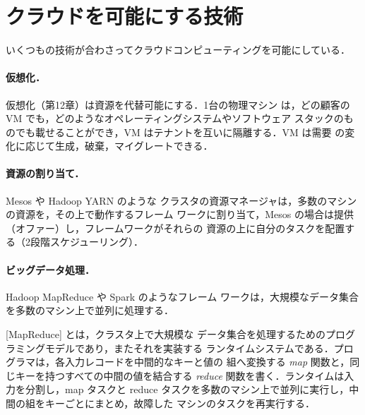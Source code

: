 \documentclass[../main.tex]{subfiles}
\begin{document}
\section{クラウドを可能にする技術}
\label{sec:l16-technologies}

いくつもの技術が合わさってクラウドコンピューティングを可能にしている．

\paragraph{仮想化．}仮想化（第12章）は資源を代替可能にする．1台の物理マシン
は，どの顧客の VM でも，どのようなオペレーティングシステムやソフトウェア
スタックのものでも載せることができ，VM はテナントを互いに隔離する．VM は需要
の変化に応じて生成，破棄，マイグレートできる．

\paragraph{資源の割り当て．}Mesos \cite{hindman2011} や Hadoop YARN のような
クラスタの資源マネージャは，多数のマシンの資源を，その上で動作するフレーム
ワークに割り当て，Mesos の場合は提供（オファー）し，フレームワークがそれらの
資源の上に自分のタスクを配置する（2段階スケジューリング）．

\paragraph{ビッグデータ処理．}Hadoop MapReduce や Spark のようなフレーム
ワークは，大規模なデータ集合を多数のマシン上で並列に処理する．

\begin{definition}[MapReduce]
  [MapReduce] \cite{dean2004} とは，クラスタ上で大規模な
  データ集合を処理するためのプログラミングモデルであり，またそれを実装する
  ランタイムシステムである．プログラマは，各入力レコードを中間的なキーと値の
  組へ変換する \emph{map} 関数と，同じキーを持つすべての中間の値を結合する
  \emph{reduce} 関数を書く．ランタイムは入力を分割し，map タスクと reduce
  タスクを多数のマシン上で並列に実行し，中間の組をキーごとにまとめ，故障した
  マシンのタスクを再実行する．
\end{definition}
\end{document}
